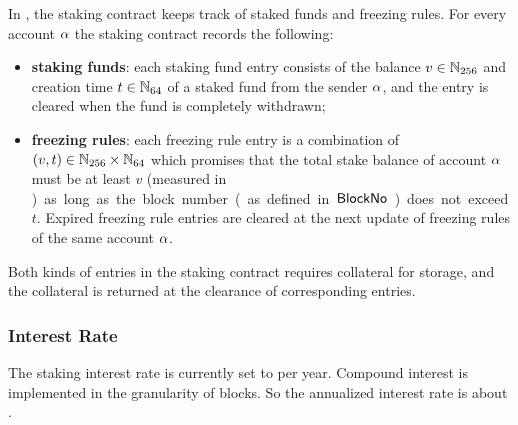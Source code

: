 In \name, the staking contract keeps track of staked funds and freezing rules. For every account $\mathbf{\alpha}$ the staking contract records the following:
\begin{itemize}
	\item {\bf staking funds}: each staking fund entry consists of the balance $v\in\mathbb{N}_{256}$ and creation time $t\in\mathbb{N}_{64}$ of a staked fund from the sender $\mathbf{\alpha}$, and the entry is cleared when the fund is completely withdrawn;
	

	\item {\bf freezing rules}: each freezing rule entry is a combination of $(v,t)\in \mathbb{N}_{256}\times\mathbb{N}_{64}$ which promises that the total stake balance of account $\mathbf{\alpha}$ must be at least $v$ (measured in \unit) as long as the block number (as defined in \hyperlink{blockno}{$\mathsf{BlockNo}$}) does not exceed $t$. 
	Expired freezing rule entries are cleared at the next update of freezing rules of the same account $\mathbf{\alpha}$.	
\end{itemize}

Both kinds of entries in the staking contract requires collateral for storage, and the collateral is returned at the clearance of corresponding entries.



\subsubsection{Interest Rate}

The staking interest rate is currently set to \interest per year.
Compound interest is implemented in the granularity of blocks.
So the annualized interest rate is about \annualinterest.

